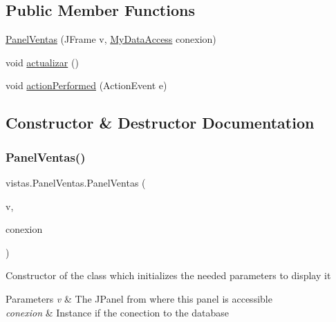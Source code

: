 \subsection*{Public Member Functions}
\begin{DoxyCompactItemize}
\item 
\mbox{\hyperlink{classvistas_1_1_panel_ventas_a5d1bdf141c04ad2c30950b7fc46a445d}{Panel\+Ventas}} (J\+Frame v, \mbox{\hyperlink{classconexion_s_q_l_1_1_my_data_access}{My\+Data\+Access}} conexion)
\item 
void \mbox{\hyperlink{classvistas_1_1_panel_ventas_ab927e7c1043fcaa7ab00e7ac6514e3da}{actualizar}} ()
\item 
void \mbox{\hyperlink{classvistas_1_1_panel_ventas_a4265266a054c7b38d50b30e754a548b6}{action\+Performed}} (Action\+Event e)
\end{DoxyCompactItemize}


\subsection{Constructor \& Destructor Documentation}
\mbox{\label{classvistas_1_1_panel_ventas_a5d1bdf141c04ad2c30950b7fc46a445d}} 
\subsubsection{\texorpdfstring{Panel\+Ventas()}{PanelVentas()}}
{\footnotesize\ttfamily vistas.\+Panel\+Ventas.\+Panel\+Ventas (\begin{DoxyParamCaption}\item[{J\+Frame}]{v,  }\item[{\mbox{\hyperlink{classconexion_s_q_l_1_1_my_data_access}{My\+Data\+Access}}}]{conexion }\end{DoxyParamCaption})}

Constructor of the class which initializes the needed parameters to display it 
\begin{DoxyParams}{Parameters}
{\em v} & The J\+Panel from where this panel is accessible \\
\hline
{\em conexion} & Instance if the conection to the database \\
\hline
\end{DoxyParams}


